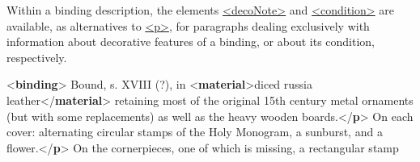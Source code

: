 Within a binding description, the elements \hyperref[TEI.decoNote]{<decoNote>} and \hyperref[TEI.condition]{<condition>} are available, as alternatives to \hyperref[TEI.p]{<p>}, for paragraphs dealing exclusively with information about decorative features of a binding, or about its condition, respectively. \par\bgroup{}\exampleFont \begin{shaded}\noindent\mbox{}{<\textbf{binding}>}\mbox{}\newline 
{}Bound, s. XVIII (?), in {<\textbf{material}>}diced russia leather{</\textbf{material}>}\mbox{}\newline 
\hspace*{1em}\hspace*{1em} retaining most of the original 15th century metal ornaments (but with some\mbox{}\newline 
\hspace*{1em}\hspace*{1em} replacements) as well as the heavy wooden boards.{</\textbf{p}>}\mbox{}\newline 
{}\mbox{}\newline 
\hspace*{1em}On each cover: alternating circular stamps of the Holy Monogram, a\mbox{}\newline 
\hspace*{1em}\hspace*{1em}\hspace*{1em}\hspace*{1em} sunburst, and a flower.{</\textbf{p}>}\mbox{}\newline 
{}\mbox{}\newline 
{}\mbox{}\newline 
\hspace*{1em}On the cornerpieces, one of which is missing, a rectangular stamp\mbox{}\newline 

\end{shaded}
